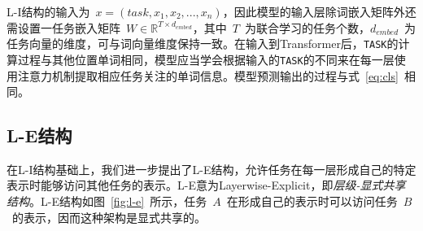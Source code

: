 L-I结构的输入为~$x=(task, x_1, x_2, ..., x_n)$，因此模型的输入层除词嵌入矩阵外还需设置一任务嵌入矩阵~$W\in \mathbb{R}^{T\times d_{embed}}$，其中~$T$~为联合学习的任务个数，$d_{embed}$~为任务向量的维度，可与词向量维度保持一致。在输入到Transformer后，\texttt{TASK}的计算过程与其他位置单词相同，模型应当学会根据输入的\texttt{TASK}的不同来在每一层使用注意力机制提取相应任务关注的单词信息。模型预测输出的过程与式~\ref{eq:cls}~相同。

\subsection{L-E结构}
在L-I结构基础上，我们进一步提出了L-E结构，允许任务在每一层形成自己的特定表示时能够访问其他任务的表示。L-E意为Layerwise-Explicit，即\emph{层级-显式共享结构}。L-E结构如图~\ref{fig:l-e}~所示，任务~$A$~在形成自己的表示时可以访问任务~$B$~的表示，因而这种架构是显式共享的。

